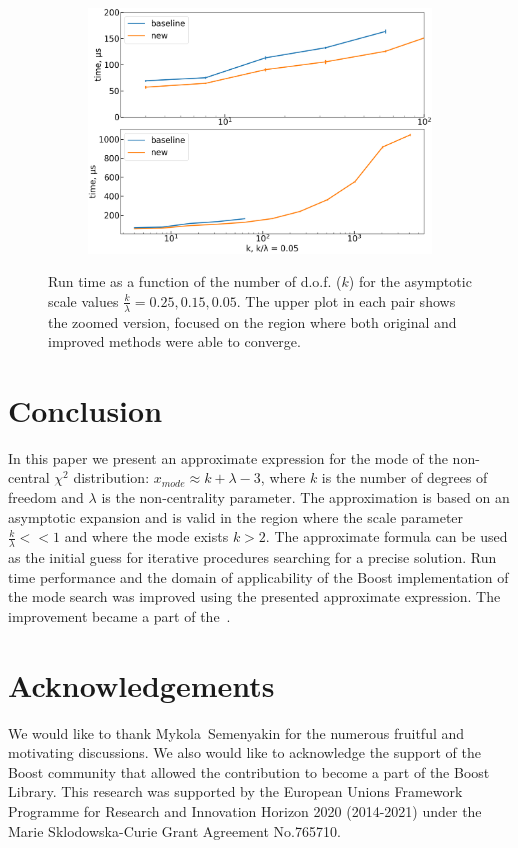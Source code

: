 \documentclass[final,5p,twocolumn,times,authoryear]{elsarticle}
\begin{document}
\begin{figure}[t]
\begin{subfigure}[t]{0.46\textwidth}
		\includegraphics[width=\linewidth]{boost_scale_fixed_0_05.png}
		\caption{}
	\end{subfigure}
	\caption{Run time as a function of the number of d.o.f. ($k$) for the asymptotic scale values $\frac{k}{\lambda}=0.25,0.15,0.05$. The upper plot in each pair shows the zoomed version, focused on the region where both original and improved methods were able to converge.}\label{fig:boost-lam-fixed}
\end{figure}

\section{Conclusion}
In this paper we present an approximate expression for the mode of the non-central $\chi^2$ distribution: $x_{mode} \approx k + \lambda - 3$, where $k$ is the number of degrees of freedom and $\lambda$ is the non-centrality parameter. The approximation is based on an asymptotic expansion and is valid in the region where the scale parameter $\frac{k}{\lambda} << 1$ and where the mode exists $k > 2$. The approximate formula can be used as the initial guess for iterative procedures searching for a precise solution. Run time performance and the domain of applicability of the Boost implementation of the mode search was improved using the presented approximate expression. The improvement became a part of the~\cite{gbench-script}.

\section{Acknowledgements}

We would like to thank Mykola~Semenyakin for the numerous fruitful and motivating discussions. We also would like to acknowledge the support of the Boost community that allowed the contribution to become a part of the Boost Library. This research was supported by the European Unions Framework Programme for Research and Innovation Horizon 2020 (2014-2021) under the Marie Sklodowska-Curie Grant Agreement No.765710.



\end{document}
